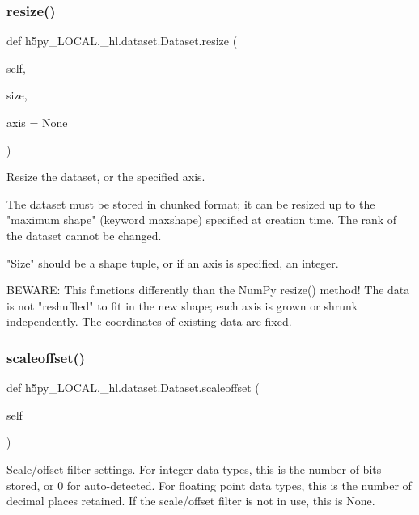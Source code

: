 \subsubsection{\texorpdfstring{resize()}{resize()}}
{\footnotesize\ttfamily def h5py\+\_\+\+L\+O\+C\+A\+L.\+\_\+hl.\+dataset.\+Dataset.\+resize (\begin{DoxyParamCaption}\item[{}]{self,  }\item[{}]{size,  }\item[{}]{axis = {\ttfamily None} }\end{DoxyParamCaption})}

\begin{DoxyVerb}Resize the dataset, or the specified axis.

The dataset must be stored in chunked format; it can be resized up to
the "maximum shape" (keyword maxshape) specified at creation time.
The rank of the dataset cannot be changed.

"Size" should be a shape tuple, or if an axis is specified, an integer.

BEWARE: This functions differently than the NumPy resize() method!
The data is not "reshuffled" to fit in the new shape; each axis is
grown or shrunk independently.  The coordinates of existing data are
fixed.
\end{DoxyVerb}
 \mbox{\label{classh5py__LOCAL_1_1__hl_1_1dataset_1_1Dataset_a43968f88f601d828dacfee2cb7875238}} 
\subsubsection{\texorpdfstring{scaleoffset()}{scaleoffset()}}
{\footnotesize\ttfamily def h5py\+\_\+\+L\+O\+C\+A\+L.\+\_\+hl.\+dataset.\+Dataset.\+scaleoffset (\begin{DoxyParamCaption}\item[{}]{self }\end{DoxyParamCaption})}

\begin{DoxyVerb}Scale/offset filter settings. For integer data types, this is
the number of bits stored, or 0 for auto-detected. For floating
point data types, this is the number of decimal places retained.
If the scale/offset filter is not in use, this is None.\end{DoxyVerb}
 \mbox{\label{classh5py__LOCAL_1_1__hl_1_1dataset_1_1Dataset_a561726a997e3a5b828e1665003c4cd9b}} 
